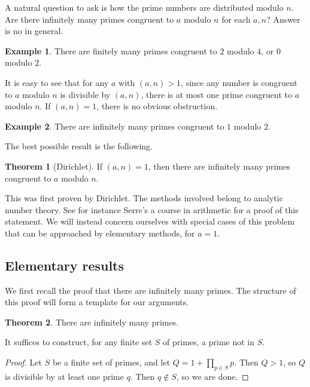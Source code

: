 \documentclass{article}
\newcommand{\rb}[1]{\left( #1 \right)}
\theoremstyle{definition}\newtheorem{definition}{Definition}
\theoremstyle{definition}\newtheorem{remark}[definition]{Remark}
\theoremstyle{definition}\newtheorem*{example}{Example}
\theoremstyle{definition}\newtheorem*{note}{Note}
\newtheorem{theorem}[definition]{Theorem}
\begin{document}
A natural question to ask is how the prime numbers are distributed modulo $ n $. Are there infinitely many primes congruent to $ a $ modulo $ n $ for each $ a, n $? Answer is no in general.

\begin{example}
There are finitely many primes congruent to $ 2 $ modulo $ 4 $, or $ 0 $ modulo $ 2 $.
\end{example}

It is easy to see that for any $ a $ with $ \rb{a, n} > 1 $, since any number is congruent to $ a $ modulo $ n $ is divisible by $ \rb{a, n} $, there is at most one prime congruent to $ a $ modulo $ n $. If $ \rb{a, n} = 1 $, there is no obvious obstruction.

\begin{example}
There are infinitely many primes congruent to $ 1 $ modulo $ 2 $.
\end{example}

The best possible result is the following.

\begin{theorem}[Dirichlet]
If $ \rb{a, n} = 1 $, then there are infinitely many primes congruent to $ a $ modulo $ n $.
\end{theorem}

This was first proven by Dirichlet. The methods involved belong to analytic number theory. See for instance Serre's a course in arithmetic for a proof of this statement. We will instead concern ourselves with special cases of this problem that can be approached by elementary methods, for $ a = 1 $.

\subsection{Elementary results}

We first recall the proof that there are infinitely many primes. The structure of this proof will form a template for our arguments.

\begin{theorem}
There are infinitely many primes.
\end{theorem}

It suffices to construct, for any finite set $ S $ of primes, a prime not in $ S $.

\begin{proof}
Let $ S $ be a finite set of primes, and let $ Q = 1 + \prod_{p \in S} p $. Then $ Q > 1 $, so $ Q $ is divisible by at least one prime $ q $. Then $ q \notin S $, so we are done.
\end{proof}
\end{document}

